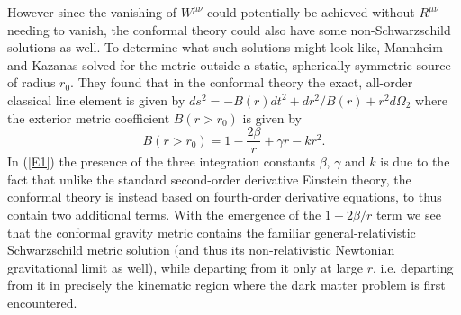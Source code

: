 \documentclass[preprint,aps]{revtex4}
\begin{document}
However since  the vanishing of $W^{\mu\nu}$ could potentially be achieved without $R^{\mu\nu}$ needing to vanish, the conformal theory could also have some non-Schwarzschild solutions as well. To determine what such solutions might look like, Mannheim and Kazanas solved for the metric outside a static, spherically symmetric source of radius $r_0$. They found \cite{Mannheim1989} that in the conformal theory the exact, all-order classical line element is given by $ds^2=-B(r)dt^2+dr^2/B(r)+r^2d\Omega_2$ where the exterior metric coefficient $B(r>r_0)$ is given by 
%
\begin{equation}
B(r>r_0)=1-\frac{2\beta}{r}+\gamma r -kr^2.
\label{E1}
\end{equation}
%
In (\ref{E1}) the presence of the three integration constants $\beta$, $\gamma$ and $k$ is  due to the fact that unlike the standard second-order derivative Einstein theory, the conformal theory is instead based on fourth-order derivative equations, to thus contain two additional terms. With the emergence of the $1-2\beta/r$ term we see that the conformal gravity metric contains the familiar general-relativistic Schwarzschild metric solution (and thus its non-relativistic Newtonian gravitational limit as well), while departing from it only at large $r$, i.e.  departing from it in precisely the kinematic region where the dark matter problem is first encountered.
\end{document}
